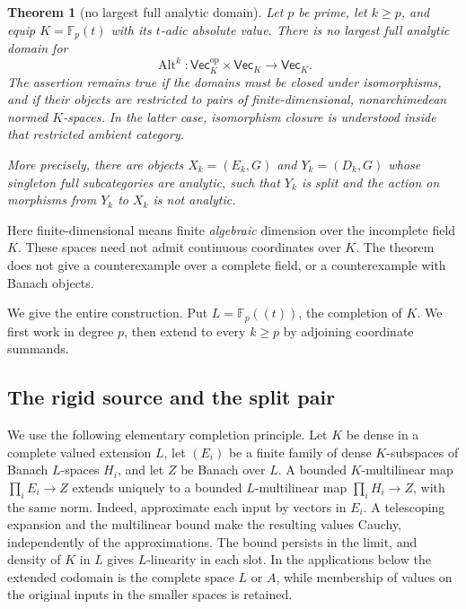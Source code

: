 \documentclass[11pt]{amsart}
\newtheorem{theorem}{Theorem}[section]
\theoremstyle{definition}
\theoremstyle{remark}
\numberwithin{equation}{section}
\newcommand{\F}{\mathbb F}
\newcommand{\Alt}{\operatorname{Alt}}
\theoremstyle{plain}
\theoremstyle{definition}
\theoremstyle{plain}
\begin{document}
\begin{theorem}[no largest full analytic domain]\label{dom:no-largest}
Let $p$ be prime, let $k\ge p$, and equip $K=\F_p(t)$ with its $t$\nobreakdash-adic absolute value.
There is no largest full analytic domain for
\[
\Alt^k\colon\mathsf{Vec}_K^{\mathrm{op}}\times\mathsf{Vec}_K\longrightarrow\mathsf{Vec}_K.
\]
The assertion remains true if the domains must be closed under isomorphisms, and if their objects are
restricted to pairs of finite-dimensional, nonarchimedean normed $K$\nobreakdash-spaces. In the latter case,
isomorphism closure is understood inside that restricted ambient category.

More precisely, there are objects $X_k=(E_k,G)$ and $Y_k=(D_k,G)$ whose singleton full subcategories
are analytic, such that $Y_k$ is split and the action on morphisms from $Y_k$ to $X_k$ is not analytic.
\end{theorem}

Here finite-dimensional means finite \emph{algebraic} dimension over the incomplete field $K$. These spaces
need not admit continuous coordinates over $K$. The theorem does not give a counterexample over a complete
field, or a counterexample with Banach objects.


We give the entire construction. Put $L=\F_p((t))$, the completion of $K$.
We first work in degree $p$, then extend to every $k\ge p$ by adjoining coordinate summands.

\subsection{The rigid source and the split pair}

We use the following elementary completion principle. Let $K$ be dense in a complete valued extension $L$,
let $(E_i)$ be a finite family of dense $K$\nobreakdash-subspaces of Banach $L$\nobreakdash-spaces $H_i$,
and let $Z$ be Banach over $L$.
A bounded $K$\nobreakdash-multilinear map $\prod_iE_i\to Z$ extends uniquely to a bounded
$L$\nobreakdash-multilinear map $\prod_iH_i\to Z$, with the same norm. Indeed, approximate each input by
vectors in $E_i$. A telescoping expansion and the multilinear bound make the resulting values Cauchy,
independently of the approximations. The bound persists in the limit, and density of $K$ in $L$ gives
$L$\nobreakdash-linearity in each slot. In the applications below the extended codomain is the complete
space $L$ or $A$, while membership of values on the original inputs in the smaller spaces is retained.
\end{document}
